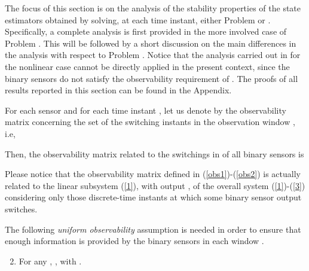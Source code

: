 \documentclass[11pt,journal,onecolumn]{IEEEtran}
\begin{document}
The focus of this section is on the analysis of the stability properties of the state estimators obtained by solving, at each time instant, either Problem  or . Specifically, a complete analysis is first provided in the more involved case of Problem . This will be followed by a short discussion on the main differences in the analysis with respect to Problem . Notice that the analysis carried out in \cite{NLMHE} for the nonlinear case cannot be directly applied in the present context, since the binary sensors do not satisfy the observability requirement of \cite{NLMHE}. The proofs of all results reported in this section can be found in the Appendix.

For each sensor  and for each time instant , let us denote by  the observability matrix concerning the set  of the switching instants in the observation window , i.e,

Then, the observability matrix related to the switchings in  of all binary sensors is

Please notice that the observability matrix defined in (\ref{obs1})-(\ref{obs2}) is actually related to the linear subsystem (\ref{1}), with output , of the overall system (\ref{1})-(\ref{3}) considering only those discrete-time instants at which some binary sensor output switches.

The following {\em uniform observability} assumption is needed in order to ensure that enough information is provided by the binary sensors in each window . \vspace{.3cm}

\begin{enumerate}[\bf {A}1]
\setcounter{enumi}{1}
\item \label{44}
For any , , with .
\end{enumerate}\vspace{.3cm}
\end{document}

